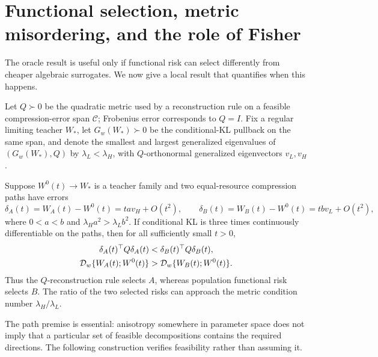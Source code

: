 \section{Functional selection, metric misordering, and the role of Fisher}
\label{sec:misordering}

The oracle result is useful only if functional risk can select differently from cheaper algebraic surrogates. We now give a local result that quantifies when this happens.

Let \(Q\succ0\) be the quadratic metric used by a reconstruction rule on a feasible compression-error span \(\mathcal C\); Frobenius error corresponds to \(Q=I\). Fix a regular limiting teacher \(W_*\), let \(G_w(W_*)\succ0\) be the conditional-KL pullback on the same span, and denote the smallest and largest generalized eigenvalues of \((G_w(W_*),Q)\) by \(\lambda_L<\lambda_H\), with \(Q\)-orthonormal generalized eigenvectors \(v_L,v_H\).

\begin{theorem}
\label{thm:misordering}
Suppose \(W^0(t)\to W_*\) is a teacher family and two equal-resource compression paths have errors
\[
\delta_A(t)=W_A(t)-W^0(t)=ta v_H+O(t^2),\qquad
\delta_B(t)=W_B(t)-W^0(t)=tb v_L+O(t^2),
\]
where \(0<a<b\) and \(\lambda_Ha^2>\lambda_Lb^2\). If conditional KL is three times continuously differentiable on the paths, then for all sufficiently small \(t>0\),
\begin{align*}
\delta_A(t)^\top Q\delta_A(t)&<\delta_B(t)^\top Q\delta_B(t),\\
\mathcal D_w\{W_A(t);W^0(t)\}&>
\mathcal D_w\{W_B(t);W^0(t)\}.
\end{align*}
Thus the \(Q\)-reconstruction rule selects \(A\), whereas population functional risk selects \(B\). The ratio of the two selected risks can approach the metric condition number \(\lambda_H/\lambda_L\).
\end{theorem}

The path premise is essential: anisotropy somewhere in parameter space does not imply that a particular set of feasible decompositions contains the required directions.  The following construction verifies feasibility rather than assuming it.

